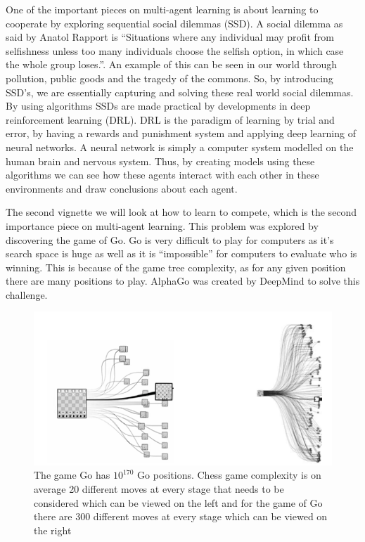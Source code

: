 \documentclass[11pt]{article} %
\begin{document}
One of the important pieces on multi-agent learning is about learning to cooperate by exploring sequential social dilemmas (SSD). A social dilemma as said by Anatol Rapport is “Situations where any individual may profit from selfishness unless too many individuals choose the selfish option, in which case the whole group loses.”. An example of this can be seen in our world through pollution, public goods and the tragedy of the commons. So, by introducing SSD’s, we are essentially capturing and solving these real world social dilemmas. By using algorithms SSDs are made practical by developments in deep reinforcement learning (DRL). DRL is the paradigm of learning by trial and error, by having a rewards and punishment system and applying deep learning of neural 
networks. A neural network is simply a computer system modelled on the human brain and nervous system. Thus, by creating models using these algorithms we can see how these agents interact with each other in these environments and draw conclusions about each agent.
\par

The second vignette we will look at how to learn to compete, which is the second importance piece on multi-agent learning. This problem was explored by discovering the game of Go. Go is very difficult to play for computers as it’s search space is huge as well as it is “impossible” for computers to evaluate who is winning. This is because of the game tree complexity, as for any given position there are many positions to play. AlphaGo was created by DeepMind to solve this challenge. 
\par

\begin{figure}[h]
	\includegraphics[width=0.8 \textwidth]{goAndChessCompare}
	\caption{The game Go has $10^{170}$ Go positions. Chess game complexity is on average 20 different moves at every stage that needs to be    		                     considered which can be viewed on the left and for the game of Go there are 300 different moves at every stage which can be viewed on the    			     right}
	\centering
\end{figure}
\end{document}
